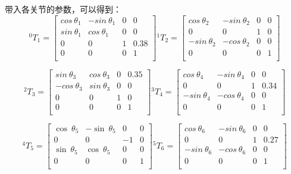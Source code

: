 带入各关节的参数，可以得到：
\begin{equation*}
    ^0T_1=\left[ \begin{matrix}	cos\!\:\theta _1&		-sin\!\:\theta _1&		0&		0\\	sin\!\:\theta _1&		cos\!\:\theta _1&		0&		0\\	0&		0&		1&		0.38\\	0&		0&		0&		1\\\end{matrix} \right] \mathrm{      }^1T_2=\left[ \begin{matrix}	cos\!\:\theta _2&		-sin\!\:\theta _2&		0&		0\\	0&		0&		1&		0\\	-sin\!\:\theta _2&		-cos\!\:\theta _2&		0&		0\\	0&		0&		0&		1\\\end{matrix} \right] 
\end{equation*}

\begin{equation*}
    ^2T_3=\left[ \begin{matrix}	sin\!\:\theta _3&		cos\!\:\theta _3&		0&		0.35\\	-cos\!\:\theta _3&		sin\!\:\theta _3&		0&		0\\	0&		0&		1&		0\\	0&		0&		0&		1\\\end{matrix} \right] \mathrm{      }^3T_4=\left[ \begin{matrix}	cos\!\:\theta _4&		-sin\!\:\theta _4&		0&		0\\	0&		0&		1&		0.34\\	-sin\!\:\theta _4&		-cos\!\:\theta _4&		0&		0\\	0&		0&		0&		1\\\end{matrix} \right] 
\end{equation*}

\begin{equation*}
    ^4T_5=\left[ \begin{matrix}	\cos \!\:\theta _5&		-\sin \!\:\theta _5&		0&		0\\	0&		0&		-1&		0\\	\sin \!\:\theta _5&		\cos \!\:\theta _5&		0&		0\\	0&		0&		0&		1\\\end{matrix} \right] \mathrm{      }^5T_6=\left[ \begin{matrix}	cos\!\:\theta _6&		-sin\!\:\theta _6&		0&		0\\	0&		0&		1&		0.27\\	-sin\!\:\theta _6&		-cos\!\:\theta _6&		0&		0\\	0&		0&		0&		1\\\end{matrix} \right] 
\end{equation*}

